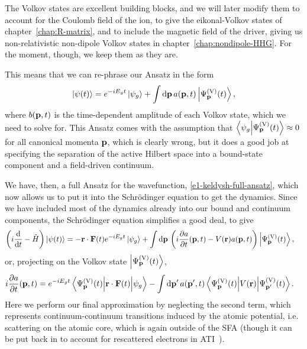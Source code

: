 The Volkov states are excellent building blocks, and we will later modify them to account for the Coulomb field of the ion, to give the eikonal-Volkov states of chapter~\ref{chap:R-matrix}, and to include the magnetic field of the driver, giving us non-relativistic non-dipole Volkov states in chapter~\ref{chap:nondipole-HHG}. For the moment, though, we keep them as they are.


This means that we can re-phrase our Ansatz in the form
\begin{equation}
\ket{\psi(t)} 
= 
e^{-iE_g t}\ket{\psi_g} 
+ \int \mathrm{d}\vb{p} \,a(\vb{p},t) \ket{\Psi^\mathrm{(V)}_{\vb{p}}(t)}, 
\label{e1-keldysh-full-ansatz}
\end{equation}
where $b(\vb{p},t)$ is the time-dependent amplitude of each Volkov state, which we need to solve for. This Ansatz comes with the assumption that $\braket{\psi_g}{\Psi^\mathrm{(V)}_{\vb{p}}(t)} \approx 0$ for all canonical momenta $\vb{p}$, which is clearly wrong, but it does a good job at specifying the separation of the active Hilbert space into a bound-state component and a field-driven continuum. 

We have, then, a full Ansatz for the wavefunction, \eqref{e1-keldysh-full-ansatz}, which now allows us to put it into the Schrödinger equation to get the dynamics. Since we have included most of the dynamics already into our bound and continuum components, the Schrödinger equation simplifies a good deal, to give
\begin{align}
\left(
i\frac{\mathrm{d}}{\mathrm{d} t}
-\hat H
\right)\ket{\psi(t)}
& =
-\vb{r}\cdot\vb{F}(t) e^{-iE_g t}\ket{\psi_g}
+ \int \mathrm{d}\vb{p} \,
\left( 
i\frac{\partial a}{\partial t}(\vb{p},t) 
-V(\vb{r})a(\vb{p},t)
\right)
\ket{\Psi^\mathrm{(V)}_{\vb{p}}(t)}
,
\end{align} 
or, projecting on the Volkov state $\ket{\Psi^\mathrm{(V)}_{\vb{p}}(t)}$,
\begin{align}
i\frac{\partial a}{\partial t}(\vbp,t)
& =
e^{-iE_g t}\matrixel{\Psi_{\vbp}^\mathrm{(V)}(t)}{\vbr\cdot\vbf(t)}{\psi_g}
-\int \d\vbp' \,
a(\vbp',t)
\matrixel{\Psi_{\vbp}^\mathrm{(V)}(t)}{V(\vbr)}{\Psi_{\vbp'}^\mathrm{(V)}(t)}
.
\end{align}
Here we perform our final approximation by neglecting the second term, which represents continuum-continuum transitions induced by the atomic potential, i.e. scattering on the atomic core, which is again outside of the SFA (though it can be put back in to account for rescattered electrons in ATI~\cite{milosevic_ISFA-standard_2007}).

